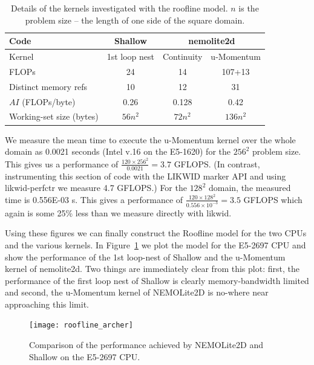 \documentclass[12pt]{article}
\begin{document}
\begin{table}
\begin{tabular}{|l|c|c|c|}
\hline
Code                       & Shallow & \multicolumn{2}{c|}{nemolite2d} \\
\hline
Kernel                     & 1st loop nest & Continuity & u-Momentum \\
\hline                                
FLOPs                      & 24      &    14      &   107+13   \\
Distinct memory refs       & 10      &    12      &   31       \\
$AI$ (FLOPs/byte)          & 0.26    &  0.128     &   0.42     \\
Working-set size (bytes)   & $56n^2$ &  $72n^2$   &   $136n^2$ \\
\hline
\end{tabular}
\caption{Details of the kernels investigated with the roofline
  model. $n$ is the problem size -- the length of one side of the
  square domain.}
\label{TAB_kernel_details}
\end{table}

We measure the mean time to execute the u-Momentum kernel over the
whole domain as 0.0021 seconds (Intel v.16 on the E5-1620) for the
$256^2$ problem size. This gives us a performance of $\frac{120\times
  256^2}{0.0021} = 3.7$ GFLOPS. (In contrast, instrumenting this
section of code with the LIKWID marker API and using likwid-perfctr we
measure 4.7 GFLOPS.)  For the $128^2$ domain, the measured time is
0.556E-03 s. This gives a performance of $\frac{120\times
  128^2}{0.556\times10^{-3}} = 3.5$ GFLOPS which again is some 25\% less
than we measure directly with likwid.

Using these figures we can finally construct the Roofline model for
the two CPUs and the various kernels. In
Figure~\ref{FIG_roofline_archer} we plot the model for the E5-2697 CPU
and show the performance of the 1st loop-nest of Shallow and the
u-Momentum kernel of nemolite2d. Two things are immediately clear from
this plot: first, the performance of the first loop nest of Shallow is
clearly memory-bandwidth limited and second, the u-Momentum kernel of
NEMOLite2D is no-where near approaching this limit.

\begin{figure}
\centering
\texttt{[image: roofline\_archer]}
\caption{Comparison of the performance achieved by NEMOLite2D and
  Shallow on the E5-2697 CPU.}
\label{FIG_roofline_archer}
\end{figure}
\end{document}
